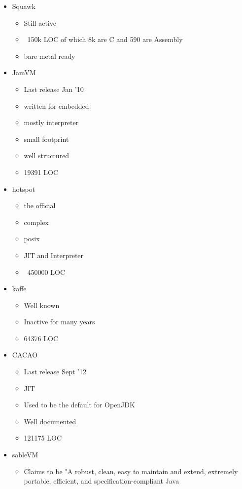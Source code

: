 \documentclass[
a4paper,
12pt,
]{report}
\begin{document}
\begin{itemize}
\item Squawk
  \begin{itemize}
  \item Still active
  \item ~150k LOC of which 8k are C and 590 are Assembly

  \item bare metal ready
  \end{itemize}
\item JamVM
  \begin{itemize}
  \item Last release Jan '10
  \item written for embedded
  \item mostly interpreter
  \item small footprint
  \item well structured
  \item 19391 LOC
  \end{itemize}
\item hotspot
  \begin{itemize}
  \item the official
  \item complex
  \item posix
  \item JIT and Interpreter
  \item ~450000 LOC
  \end{itemize}
\item kaffe
  \begin{itemize}
  \item Well known
  \item Inactive for many years
  \item 64376 LOC
  \end{itemize}
\item CACAO
  \begin{itemize}
  \item Last release Sept '12
  \item JIT
  \item Used to be the default for OpenJDK
  \item Well documented
  \item 121175 LOC
  \end{itemize}
\item sableVM
  \begin{itemize}
  \item Claims to be "A robust, clean, easy to maintain and extend,
     extremely portable, efficient, and specification-compliant Java

\end{itemize}
\end{itemize}
\end{document}
